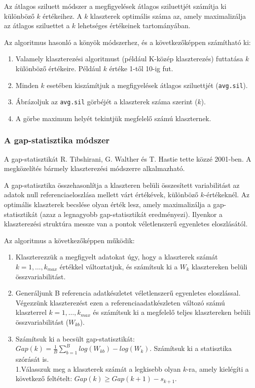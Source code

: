 \documentclass[
  letterpaper,
]{krantz}
\providecommand{\tightlist}{%
  \setlength{\itemsep}{0pt}\setlength{\parskip}{0pt}}\usepackage{longtable,booktabs,array}
\begin{document}
Az átlagos sziluett módszer a megfigyelések átlagos sziluettjét számítja
ki különböző \(k\) értékeihez. A \(k\) klaszterek optimális száma az,
amely maximalizálja az átlagos sziluettet a \(k\) lehetséges értékeinek
tartományában.

Az algoritmus hasonló a könyök módszerhez, és a következőképpen
számítható ki:

\begin{enumerate}
\def\labelenumi{\arabic{enumi}.}
\tightlist
\item
  Valamely klaszterezési algoritmust (például K-közép klaszterezés)
  futtatása \(k\) különböző értékeire. Például \(k\) értéke 1-től 10-ig
  fut.
\item
  Minden \(k\) esetében kiszámítjuk a megfigyelések átlagos sziluettjét
  (\texttt{avg.sil}).
\item
  Ábrázoljuk az \texttt{avg.sil} görbéjét a klaszterek száma szerint
  (\(k\)).
\item
  A görbe maximum helyét tekintjük megfelelő számú klaszternek.
\end{enumerate}

\hypertarget{a-gap-statisztika-muxf3dszer}{%
\subsubsection{A gap-statisztika
módszer}\label{a-gap-statisztika-muxf3dszer}}

A gap-statisztikát R. Tibshirani, G. Walther és T. Hastie tette közzé
2001-ben. A megközelítés bármely klaszterezési módszerre alkalmazható.

A gap-statisztika összehasonlítja a klaszteren belüli összesített
variabilitást az adatok null referenciaeloszlása mellett várt értékévek,
különböző \(k\)-értékeknél. Az optimális klaszterek becslése olyan érték
lesz, amely maximalizálja a gap-statisztikát (azaz a legnagyobb
gap-statisztikát eredményezi). Ilyenkor a klaszterezési struktúra messze
van a pontok véletlenszerű egyenletes eloszlásától.

Az algoritmus a következőképpen működik:

\begin{enumerate}
\def\labelenumi{\arabic{enumi}.}
\tightlist
\item
  Klaszterezzük a megfigyelt adatokat úgy, hogy a klaszterek számát
  \(k=1, \dots, k_{max}\) értékkel változtatjuk, és számítsuk ki a
  \(W_k\) klasztereken belüli összvariabilitást.
\item
  Generáljunk B referencia adatkészletet véletlenszerű egyenletes
  eloszlással. Végezzünk klaszterezést ezen a referenciaadatkészleten
  változó számú klaszterrel \(k=1, \dots, k_{max}\) és számítsuk ki a
  megfelelő teljes klasztereken belüli összvariabilitást (\(W_{kb}\)).
\item
  Számítsuk ki a becsült gap-statisztikát:
  \(Gap(k)=\frac{1}{B}\sum_{b=1}^Blog(W_{kb})−log(W_k)\). Számítsuk ki a
  statisztika szórását is.\\
  1.Válasszuk meg a klaszterek számát a legkisebb olyan \(k\)-ra, amely
  kielégíti a következő feltételt: \(Gap(k)\geq Gap(k+1)−s_{k+1}\).
\end{enumerate}
\end{document}
